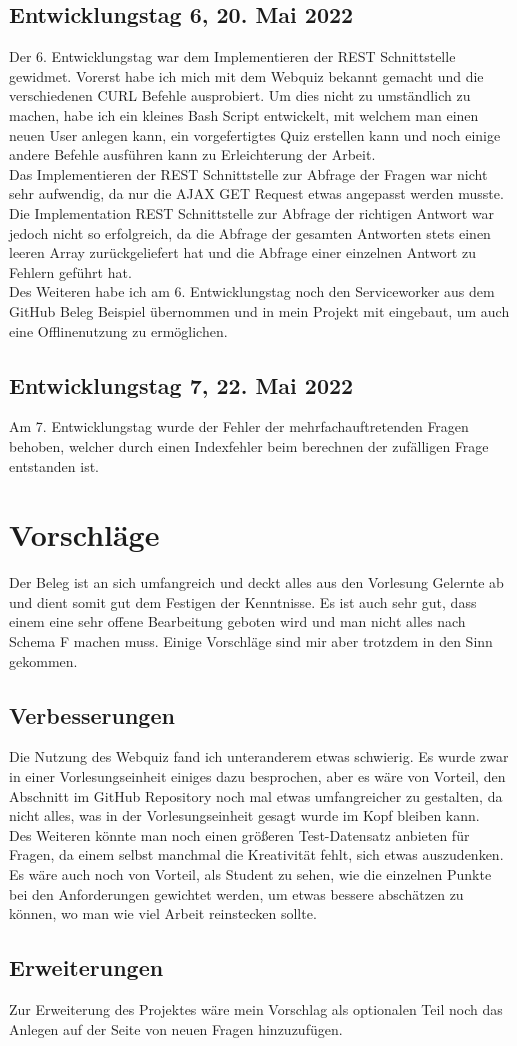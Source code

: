 \documentclass[a4paper,12pt,titlepage]{scrartcl}
\begin{document}
        \subsection{Entwicklungstag 6, 20. Mai 2022}
            Der 6. Entwicklungstag war dem Implementieren der REST Schnittstelle gewidmet. Vorerst habe ich mich mit dem Webquiz bekannt gemacht und die verschiedenen CURL Befehle ausprobiert. Um dies nicht zu umständlich zu machen, habe ich ein kleines Bash Script entwickelt, mit welchem man einen neuen User anlegen kann, ein vorgefertigtes Quiz erstellen kann und noch einige andere Befehle ausführen kann zu Erleichterung der Arbeit.\\
            Das Implementieren der REST Schnittstelle zur Abfrage der Fragen war nicht sehr aufwendig, da nur die AJAX GET Request etwas angepasst werden musste. Die Implementation REST Schnittstelle zur Abfrage der richtigen Antwort war jedoch nicht so erfolgreich, da die Abfrage der gesamten Antworten stets einen leeren Array zurückgeliefert hat und die Abfrage einer einzelnen Antwort zu Fehlern geführt hat.\\
            Des Weiteren habe ich am 6. Entwicklungstag noch den Serviceworker aus dem GitHub Beleg Beispiel übernommen und in mein Projekt mit eingebaut, um auch eine Offlinenutzung zu ermöglichen.
        \subsection{Entwicklungstag 7, 22. Mai 2022}
            Am 7. Entwicklungstag wurde der Fehler der mehrfachauftretenden Fragen behoben, welcher durch einen Indexfehler beim berechnen der zufälligen Frage entstanden ist.
    \newpage
    \section{Vorschläge}
        Der Beleg ist an sich umfangreich und deckt alles aus den Vorlesung Gelernte ab und dient somit gut dem Festigen der Kenntnisse. Es ist auch sehr gut, dass einem eine sehr offene Bearbeitung geboten wird und man nicht alles nach Schema F machen muss. Einige Vorschläge sind mir aber trotzdem in den Sinn gekommen.
        \subsection{Verbesserungen}
            Die Nutzung des Webquiz fand ich unteranderem etwas schwierig. Es wurde zwar in einer Vorlesungseinheit einiges dazu besprochen, aber es wäre von Vorteil, den Abschnitt im GitHub Repository noch mal etwas umfangreicher zu gestalten, da nicht alles, was in der Vorlesungseinheit gesagt wurde im Kopf bleiben kann.\\
            Des Weiteren könnte man noch einen größeren Test-Datensatz anbieten für Fragen, da einem selbst manchmal die Kreativität fehlt, sich etwas auszudenken.\\
            Es wäre auch noch von Vorteil, als Student zu sehen, wie die einzelnen Punkte bei den Anforderungen gewichtet werden, um etwas bessere abschätzen zu können, wo man wie viel Arbeit reinstecken sollte.
        \subsection{Erweiterungen}
            Zur Erweiterung des Projektes wäre mein Vorschlag als optionalen Teil noch das Anlegen auf der Seite von neuen Fragen hinzuzufügen.
    \newpage
\end{document}
